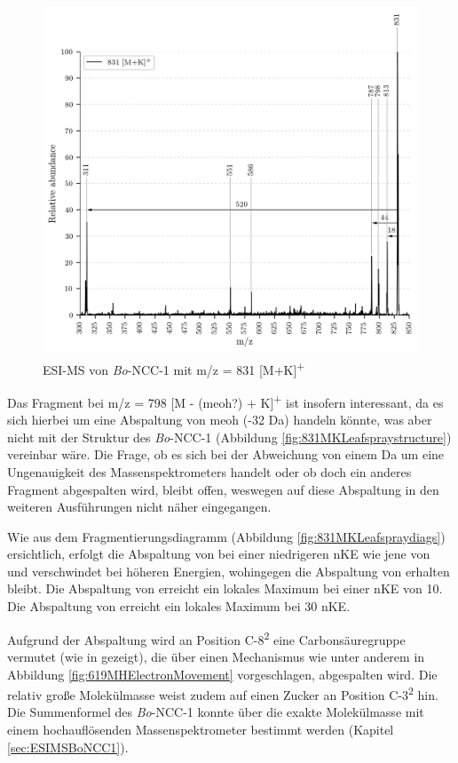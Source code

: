 \begin{figure}[!htbp]
  \includegraphics[width=\textwidth, height=0.7\textwidth]{figures/Kapitel4/Kataboliten/VWA_MS_LeafSpray_831.png}
  \caption[ESI-MS Spektrum von \textit{Bo}-NCC-1, Quelle: Autor]{ESI-MS von \textit{Bo}-NCC-1 mit m/z = 831 [M+K]\textsuperscript{+}}
  \label{fig:831MKLeafspray}
\end{figure}

Das Fragment bei m/z = 798 [M - (\gls{meoh}?) + K]\textsuperscript{+} ist insofern interessant, da es sich hierbei um eine Abspaltung von \gls{meoh} (-32 Da) handeln könnte, was aber nicht mit der Struktur des \textit{Bo}-NCC-1 (Abbildung \ref{fig:831MKLeafspraystructure}) vereinbar wäre. Die Frage, ob es sich bei der Abweichung von einem Da um eine Ungenauigkeit des Massenspektrometers handelt oder ob doch ein anderes Fragment abgespalten wird, bleibt offen, weswegen auf diese Abspaltung in den weiteren Ausführungen nicht näher eingegangen.

Wie aus dem Fragmentierungsdiagramm (Abbildung \ref{fig:831MKLeafspraydiags}) ersichtlich, erfolgt die Abspaltung von  bei einer niedrigeren \gls{nKE} wie jene von  und verschwindet bei höheren Energien, wohingegen die Abspaltung von  erhalten bleibt. Die Abspaltung von  erreicht ein lokales Maximum bei einer \gls{nKE} von 10. Die Abspaltung von  erreicht ein lokales Maximum bei 30 \gls{nKE}.

Aufgrund der  Abspaltung wird an Position C-8\textsuperscript{2} eine Carbonsäuregruppe vermutet (wie in \cite{StructureElucidation} gezeigt), die über einen Mechanismus wie unter anderem in Abbildung \ref{fig:619MHElectronMovement} vorgeschlagen, abgespalten wird. Die relativ große Molekülmasse weist zudem auf einen Zucker an Position C-3\textsuperscript{2} hin. Die Summenformel des \textit{Bo}-NCC-1 konnte über die exakte Molekülmasse mit einem hochauflösenden Massenspektrometer bestimmt werden (Kapitel \ref{sec:ESIMSBoNCC1}).

